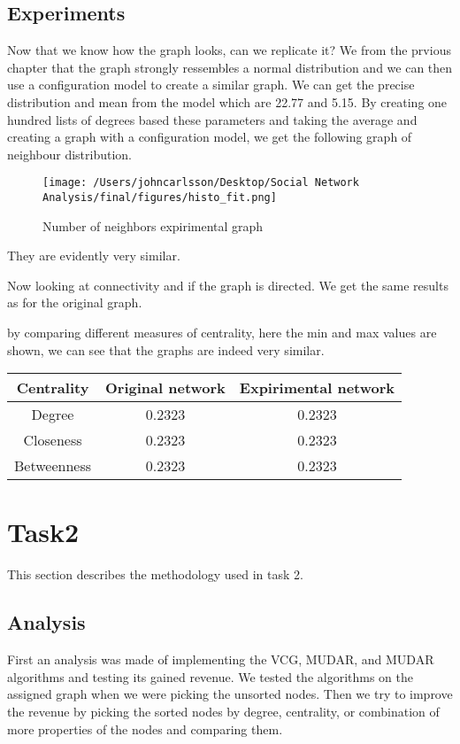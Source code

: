 \documentclass[conference]{IEEEtran}
\begin{document}
\subsection[short]{Experiments}
Now that we know how the graph looks, can we replicate it? We from the prvious chapter that the graph strongly
ressembles a normal distribution and we can then use a configuration model to create a similar graph.
We can get the precise distribution and mean from the model which are 22.77 and 5.15.
By creating one hundred lists of degrees based these parameters and taking the average and creating a graph with 
a configuration model, we get the following graph of neighbour distribution.

\begin{figure}[h]
    \centering
    \caption{Number of neighbors expirimental graph}
\texttt{[image: /Users/johncarlsson/Desktop/Social Network Analysis/final/figures/histo\_fit.png]}
\end{figure}

They are evidently very similar.

Now looking at connectivity and if the graph is directed. We get the same results as for the original graph.

by comparing different measures of centrality, here the min and max values are shown, we can see 
that the graphs are indeed very similar.

\begin{center}
    \begin{tabular}{|c|c|c|}
        
        \hline
        Centrality & Original network & Expirimental network \\
        \hline
        Degree & 0.2323 & 0.2323 \\
        \hline
        Closeness & 0.2323 & 0.2323 \\
        \hline
        Betweenness & 0.2323 & 0.2323 \\
        \hline
    \end{tabular}

\end{center}



\section{Task2}
This section describes the methodology used in task 2.

\subsection{Analysis}
First an analysis was made of implementing the VCG, MUDAR, and MUDAR algorithms and testing its gained revenue. We tested the algorithms on the assigned graph when we were picking the unsorted nodes. Then we try to improve the revenue by picking the sorted nodes by degree, centrality, or combination of more properties of the nodes and comparing them.  
\end{document}
